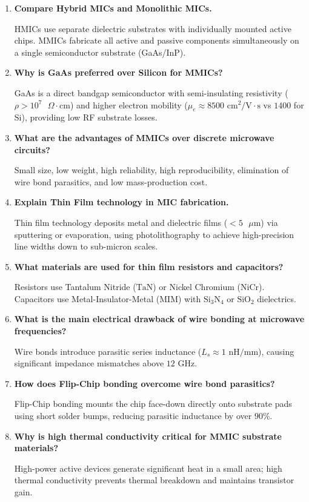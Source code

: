 \documentclass[10pt,a4paper]{article}
\newcommand{\Q}[1]{\textbf{#1}\par\vspace{2pt}}
\begin{document}
\begin{tcolorbox}[exambox, title={\textbf{Frequently Asked / Viva Questions}}]
  \begin{enumerate}[topsep=0pt, label=\textbf{Q\arabic*.}, itemsep=5pt]
    \item \Q{Compare Hybrid MICs and Monolithic MICs.}
    HMICs use separate dielectric substrates with individually mounted active chips. MMICs fabricate all active and passive components simultaneously on a single semiconductor substrate (GaAs/InP).

    \item \Q{Why is GaAs preferred over Silicon for MMICs?}
    GaAs is a direct bandgap semiconductor with semi-insulating resistivity ($\rho > 10^7\text{ }\Omega\cdot\text{cm}$) and higher electron mobility ($\mu_e \approx 8500\text{ cm}^2/\text{V}\cdot\text{s}$ vs $1400$ for Si), providing low RF substrate losses.

    \item \Q{What are the advantages of MMICs over discrete microwave circuits?}
    Small size, low weight, high reliability, high reproducibility, elimination of wire bond parasitics, and low mass-production cost.

    \item \Q{Explain Thin Film technology in MIC fabrication.}
    Thin film technology deposits metal and dielectric films ($<5\text{ }\mu\text{m}$) via sputtering or evaporation, using photolithography to achieve high-precision line widths down to sub-micron scales.

    \item \Q{What materials are used for thin film resistors and capacitors?}
    Resistors use Tantalum Nitride ($\text{TaN}$) or Nickel Chromium ($\text{NiCr}$). Capacitors use Metal-Insulator-Metal (MIM) with $\text{Si}_3\text{N}_4$ or $\text{SiO}_2$ dielectrics.

    \item \Q{What is the main electrical drawback of wire bonding at microwave frequencies?}
    Wire bonds introduce parasitic series inductance ($L_s \approx 1\text{ nH/mm}$), causing significant impedance mismatches above $12\text{ GHz}$.

    \item \Q{How does Flip-Chip bonding overcome wire bond parasitics?}
    Flip-Chip bonding mounts the chip face-down directly onto substrate pads using short solder bumps, reducing parasitic inductance by over $90\%$.

    \item \Q{Why is high thermal conductivity critical for MMIC substrate materials?}
    High-power active devices generate significant heat in a small area; high thermal conductivity prevents thermal breakdown and maintains transistor gain.


\end{enumerate}
\end{tcolorbox}
\end{document}
